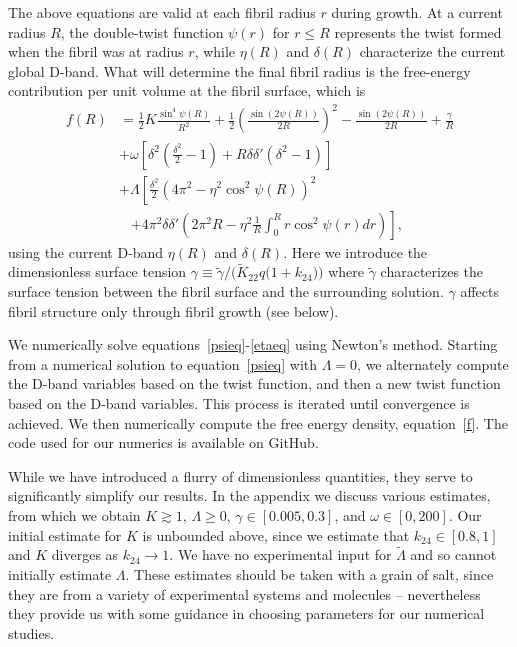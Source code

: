 \documentclass[twoside,twocolumn,9pt]{article}
\begin{document}
The above equations are valid at each fibril radius $r$ during growth. At a current radius $R$, the  double-twist function $\psi(r)$ for $r \leq R$ represents the twist formed when the fibril was at radius $r$, while $\eta(R)$ and $\delta(R)$ characterize the current global D-band. What will determine the final fibril radius is the free-energy contribution per unit volume at the fibril surface, which is
\begin{equation}\begin{aligned}\label{f}
    f(R) & = \frac{1}{2}K\frac{\sin^4\psi(R)}{R^2} + \frac{1}{2}\left(\frac{\sin(2\psi(R))}{2R}\right)^2 - \frac{\sin(2\psi(R))}{2R} +\frac{\gamma}{R}\\
    & + \omega\left[ \delta^2 \left(\frac{\delta^2}{2}-1\right) + R\delta\delta'\left(\delta^2-1\right)\right]\\
    & + \Lambda \left[ \frac{\delta^2}{2}\left(4\pi^2 - \eta^2\cos^2\psi(R)\right)^2 \right.\\
    & \; \; \; \left. + 4\pi^2\delta\delta'\left(2\pi^2 R - \eta^2\frac{1}{R}\int_0^R r\cos^2\psi(r) dr\right)\right],
\end{aligned}\end{equation}
using the current D-band $\eta(R)$ and $\delta(R)$. Here we introduce the dimensionless surface tension $\gamma \equiv \tilde{\gamma}/\big(\tilde{K}_{22}q \big(1+k_{24}\big)\big)$ where $\tilde{\gamma}$ characterizes the surface tension between the fibril surface and the surrounding solution.  $\gamma$ affects fibril structure only through fibril growth (see below).

We numerically solve equations~\ref{psieq}-\ref{etaeq} using Newton's method. Starting from a numerical solution to equation~\ref{psieq} with $\Lambda =0$, we alternately compute the D-band variables based on the  twist function, and then a new twist function based on the D-band variables. This process is iterated until convergence is achieved. We then numerically compute the free energy density, equation~\ref{f}. The code used for our numerics is available on GitHub.\cite{github} 

While we have introduced a flurry of dimensionless quantities, they serve to significantly simplify our results. In the appendix we discuss various estimates, from which we obtain $K\gtrsim 1$, $\Lambda \geq 0$, $\gamma \in [0.005, 0.3]$, and $\omega \in [0, 200]$.  Our initial estimate for $K$ is unbounded above, since we estimate that $k_{24} \in [0.8,1]$ and $K$ diverges as $k_{24} \rightarrow 1$. We have no experimental input for $\tilde{\Lambda}$ and so cannot initially estimate $\Lambda$. These estimates should be taken with a grain of salt, since they are from a variety of experimental systems and molecules -- nevertheless they provide us with some guidance in choosing parameters for our numerical studies.
\end{document}
